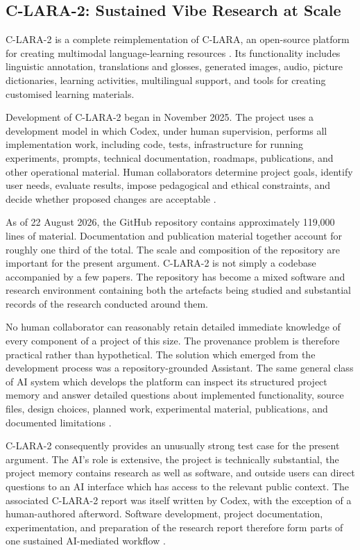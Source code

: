 \documentclass[12pt]{article}
\begin{document}
\subsection{C-LARA-2: Sustained Vibe Research at Scale}

C-LARA-2 is a complete reimplementation of C-LARA, an open-source platform for creating multimodal language-learning resources \citep{claraOriginal}. Its functionality includes linguistic annotation, translations and glosses, generated images, audio, picture dictionaries, learning activities, multilingual support, and tools for creating customised learning materials.

Development of C-LARA-2 began in November 2025. The project uses a development model in which Codex, under human supervision, performs all implementation work, including code, tests, infrastructure for running experiments, prompts, technical documentation, roadmaps, publications, and other operational material. Human collaborators determine project goals, identify user needs, evaluate results, impose pedagogical and ethical constraints, and decide whether proposed changes are acceptable \citep[Section~2.4]{bediEtAl2026clara2}.

As of 22 August 2026, the GitHub repository contains approximately 119,000 lines of material. Documentation and publication material together account for roughly one third of the total.
The scale and composition of the repository are important for the present argument. C-LARA-2 is not simply a codebase accompanied by a few papers. The repository has become a mixed software and research environment containing both the artefacts being studied and substantial records of the research conducted around them.

No human collaborator can reasonably retain detailed immediate knowledge of every component of a project of this size. The provenance problem is therefore practical rather than hypothetical.
The solution which emerged from the development process was a repository-grounded Assistant. The same general class of AI system which develops the platform can inspect its structured project memory and answer detailed questions about implemented functionality, source files, design choices, planned work, experimental material, publications, and documented limitations \citep[Section~9]{bediEtAl2026clara2}.

C-LARA-2 consequently provides an unusually strong test case for the present argument. The AI's role is extensive, the project is technically substantial, the project memory contains research as well as software, and outside users can direct questions to an AI interface which has access to the relevant public context.
The associated C-LARA-2 report was itself written by Codex, with the exception of a human-authored afterword. Software development, project documentation, experimentation, and preparation of the research report therefore form parts of one sustained AI-mediated workflow \citep[Abstract]{bediEtAl2026clara2}.
\end{document}
